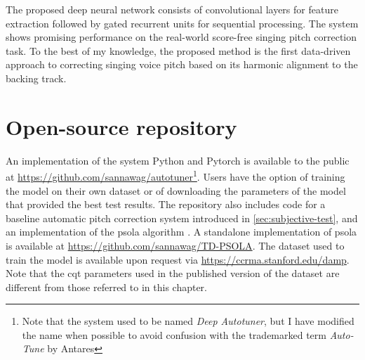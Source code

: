 The proposed deep neural network consists of convolutional layers for feature extraction followed by gated recurrent units for sequential processing. The system shows promising performance on the real-world score-free singing pitch correction task. To the best of my knowledge, the proposed method is the first data-driven approach to correcting singing voice pitch based on its harmonic alignment to the backing track.

\section{Open-source repository}
An implementation of the system Python and Pytorch is available to the public at \url{https://github.com/sannawag/autotuner}\footnote{Note that the system used to be named \textit{Deep Autotuner}, but I have modified the name when possible to avoid confusion with the trademarked term \textit{Auto-Tune} by Antares}. Users have the option of training the model on their own dataset or of downloading the parameters of the model that provided the best test results. The repository also includes code for a baseline automatic pitch correction system introduced in \ref{sec:subjective-test}, and an implementation of the \gls{psola} algorithm \cite{charpentier1986diphone}. A standalone implementation of \gls{psola} is available at \url{https://github.com/sannawag/TD-PSOLA}. The dataset used to train the model is available upon request via \url{https://ccrma.stanford.edu/damp}. Note that the \gls{cqt} parameters used in the published version of the dataset are different from those referred to in this chapter.

